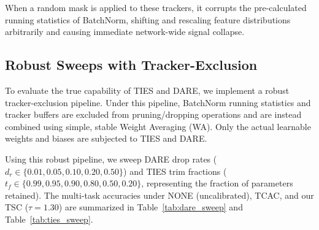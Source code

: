 \documentclass{article}
\theoremstyle{plain}
\theoremstyle{definition}
\theoremstyle{remark}
\begin{document}
When a random mask is applied to these trackers, it corrupts the pre-calculated running statistics of BatchNorm, shifting and rescaling feature distributions arbitrarily and causing immediate network-wide signal collapse.

\subsection{Robust Sweeps with Tracker-Exclusion}
To evaluate the true capability of TIES and DARE, we implement a robust tracker-exclusion pipeline. Under this pipeline, BatchNorm running statistics and tracker buffers are excluded from pruning/dropping operations and are instead combined using simple, stable Weight Averaging (WA). Only the actual learnable weights and biases are subjected to TIES and DARE.

Using this robust pipeline, we sweep DARE drop rates ($d_r \in \{0.01, 0.05, 0.10, 0.20, 0.50\}$) and TIES trim fractions ($t_f \in \{0.99, 0.95, 0.90, 0.80, 0.50, 0.20\}$, representing the fraction of parameters retained). The multi-task accuracies under NONE (uncalibrated), TCAC, and our TSC ($\tau = 1.30$) are summarized in Table~\ref{tab:dare_sweep} and Table~\ref{tab:ties_sweep}.
\end{document}
